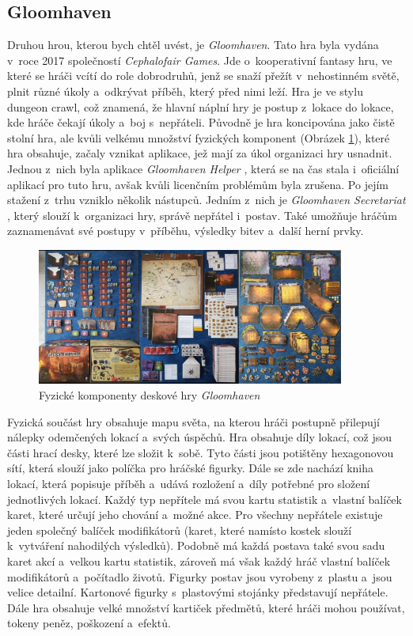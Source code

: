 \subsection{Gloomhaven}
Druhou hrou, kterou bych chtěl uvést, je \textit{Gloomhaven}. Tato hra byla vydána v~roce 2017 společností \textit{Cephalofair Games}. Jde o~kooperativní fantasy hru, ve které se hráči vcítí do role dobrodruhů, jenž se snaží přežít v~nehostinném světě, plnit různé úkoly a~odkrývat příběh, který před nimi leží. Hra je ve stylu dungeon crawl, což znamená, že hlavní náplní hry je postup z~lokace do lokace, kde hráče čekají úkoly a~boj s~nepřáteli. Původně je hra koncipována jako čistě stolní hra, ale kvůli velkému množství fyzických komponent (Obrázek \ref{fig:gloomhaven_contents}), které hra obsahuje, začaly vznikat aplikace, jež mají za úkol organizaci hry usnadnit. Jednou z~nich byla aplikace \textit{Gloomhaven Helper} \cite{gloomhaven_helper}, která se na čas stala i~oficiální aplikací pro tuto hru, avšak kvůli licenčním problémům byla zrušena. Po jejím stažení z~trhu vzniklo několik nástupců. Jedním z~nich je \textit{Gloomhaven Secretariat} \cite{gloomhaven_secretariat}, který slouží k~organizaci hry, správě nepřátel i~postav. Také umožňuje hráčům zaznamenávat své postupy v~příběhu, výsledky bitev a~další herní prvky.

\begin{figure}[H]
    \centering
    \includegraphics[width=0.9\textwidth]{resources/figures/gloomhaven.png}
    \caption{Fyzické komponenty deskové hry \textit{Gloomhaven} \cite{gloomhaven}}
    \label{fig:gloomhaven_contents}
\end{figure}

Fyzická součást hry obsahuje mapu světa, na kterou hráči postupně přilepují nálepky odemčených lokací a~svých úspěchů. Hra obsahuje díly lokací, což jsou části hrací desky, které lze složit k~sobě. Tyto části jsou potištěny hexagonovou sítí, která slouží jako políčka pro hráčské figurky. Dále se zde nachází kniha lokací, která popisuje příběh a~udává rozložení a~díly potřebné pro složení jednotlivých lokací. Každý typ nepřítele má svou kartu statistik a~vlastní balíček karet, které určují jeho chování a~možné akce. Pro všechny nepřátele existuje jeden společný balíček modifikátorů (karet, které namísto kostek slouží k~vytváření nahodilých výsledků). Podobně má každá postava také svou sadu karet akcí a~velkou kartu statistik, zároveň má však každý hráč vlastní balíček modifikátorů a~počítadlo životů. Figurky postav jsou vyrobeny z~plastu a~jsou velice detailní. Kartonové figurky s~plastovými stojánky představují nepřátele. Dále hra obsahuje velké množství kartiček předmětů, které hráči mohou používat, tokeny peněz, poškození a~efektů.